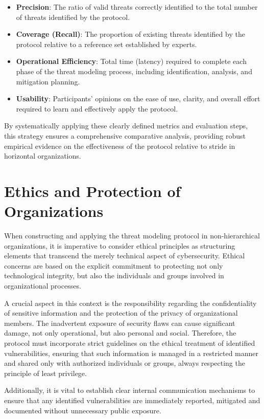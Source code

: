 \begin{itemize}
\item \textbf{Precision}: The ratio of valid threats correctly identified to the
total number of threats identified by the protocol.
\item \textbf{Coverage (Recall)}: The proportion of existing threats identified
by the protocol relative to a reference set established by experts.
\item \textbf{Operational Efficiency}: Total time (latency) required to complete
each phase of the threat modeling process, including identification, analysis,
and mitigation planning.
\item \textbf{Usability}: Participants' opinions on the ease of use, clarity,
and overall effort required to learn and effectively apply the protocol.
\end{itemize}

By systematically applying these clearly defined metrics and evaluation steps,
this strategy ensures a comprehensive comparative analysis, providing robust
empirical evidence on the effectiveness of the protocol relative to \gls{stride}
in horizontal organizations.

\section{Ethics and Protection of Organizations}
\label{sec:ethics_protection}

When constructing and applying the threat modeling protocol in non-hierarchical
organizations, it is imperative to consider ethical principles as structuring
elements that transcend the merely technical aspect of cybersecurity. Ethical
concerns are based on the explicit commitment to protecting not only
technological integrity, but also the individuals and groups involved in
organizational processes.

A crucial aspect in this context is the responsibility regarding the
confidentiality of sensitive information and the protection of the privacy of
organizational members. The inadvertent exposure of security flaws can cause
significant damage, not only operational, but also personal and social.
Therefore, the protocol must incorporate strict guidelines on the ethical
treatment of identified vulnerabilities, ensuring that such information is
managed in a restricted manner and shared only with authorized individuals or
groups, always respecting the principle of least privilege.

Additionally, it is vital to establish clear internal communication mechanisms
to ensure that any identified vulnerabilities are immediately reported,
mitigated and documented without unnecessary public exposure.

